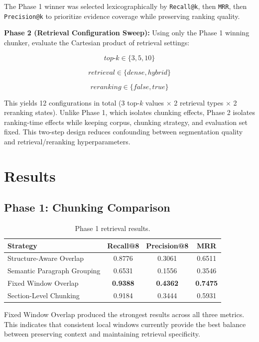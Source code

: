 \documentclass[a4paper,12pt]{article}
\begin{document}
The Phase 1 winner was selected lexicographically by \texttt{Recall@k}, then \texttt{MRR}, then \texttt{Precision@k} to prioritize evidence coverage while preserving ranking quality.

\textbf{Phase 2 (Retrieval Configuration Sweep):} Using only the Phase 1 winning chunker, evaluate the Cartesian product of retrieval settings:

\[
top\text{-}k \in \{3,5,10\}
\]

\[
retrieval \in \{dense, hybrid\}
\]

\[
reranking \in \{false,true\}
\]

This yields 12 configurations in total (3 top-$k$ values $\times$ 2 retrieval types $\times$ 2 reranking states). Unlike Phase 1, which isolates chunking effects, Phase 2 isolates ranking-time effects while keeping corpus, chunking strategy, and evaluation set fixed. This two-step design reduces confounding between segmentation quality and retrieval/reranking hyperparameters.

\newpage

\section{Results}

\subsection{Phase 1: Chunking Comparison}

\begin{table}[htbp]
\centering
\caption{Phase 1 retrieval results.}
\begin{tabular}{lccc}
\toprule
Strategy & Recall@8 & Precision@8 & MRR \\
\midrule
Structure-Aware Overlap & 0.8776 & 0.3061 & 0.6511 \\
Semantic Paragraph Grouping & 0.6531 & 0.1556 & 0.3546 \\
Fixed Window Overlap & \textbf{0.9388} & \textbf{0.4362} & \textbf{0.7475} \\
Section-Level Chunking & 0.9184 & 0.3444 & 0.5931 \\
\bottomrule
\end{tabular}
\end{table}

Fixed Window Overlap produced the strongest results across all three metrics. This indicates that consistent local windows currently provide the best balance between preserving context and maintaining retrieval specificity.
\end{document}
